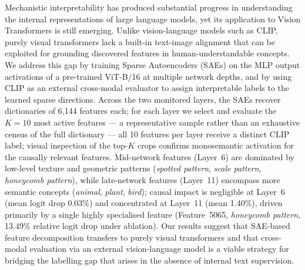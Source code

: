 Mechanistic interpretability has produced substantial progress in understanding the internal representations of large language models, yet its application to Vision Transformers is still emerging. 
Unlike vision-language models such as CLIP, purely visual transformers lack a built-in text-image alignment that can be exploited for grounding discovered features in human-understandable concepts. 
We address this gap by training Sparse Autoencoders (SAEs) on the MLP output activations of a pre-trained ViT-B/16 at multiple network depths, and by using CLIP as an external cross-modal evaluator to assign interpretable labels to the learned sparse directions. 
Across the two monitored layers, the SAEs recover dictionaries of 6,144 features each; for each layer we select and evaluate the $K{=}10$ most active features --- a representative sample rather than an exhaustive census of the full dictionary --- all 10 features per layer receive a distinct CLIP label; visual inspection of the top-$K$ crops confirms monosemantic activation for the causally relevant features.
Mid-network features (Layer~6) are dominated by low-level texture and geometric patterns (\textit{spotted pattern}, \textit{scale pattern}, \textit{honeycomb pattern}), while late-network features (Layer~11) encompass more semantic concepts (\textit{animal}, \textit{plant}, \textit{bird}); causal impact is negligible at Layer~6 (mean logit drop 0.03\%) and concentrated at Layer~11 (mean 1.40\%), driven primarily by a single highly specialised feature (Feature~5065, \textit{honeycomb pattern}, 13.49\% relative logit drop under ablation).
Our results suggest that SAE-based feature decomposition transfers to purely visual transformers and that cross-modal evaluation via an external vision-language model is a viable strategy for bridging the labelling gap that arises in the absence of internal text supervision.
